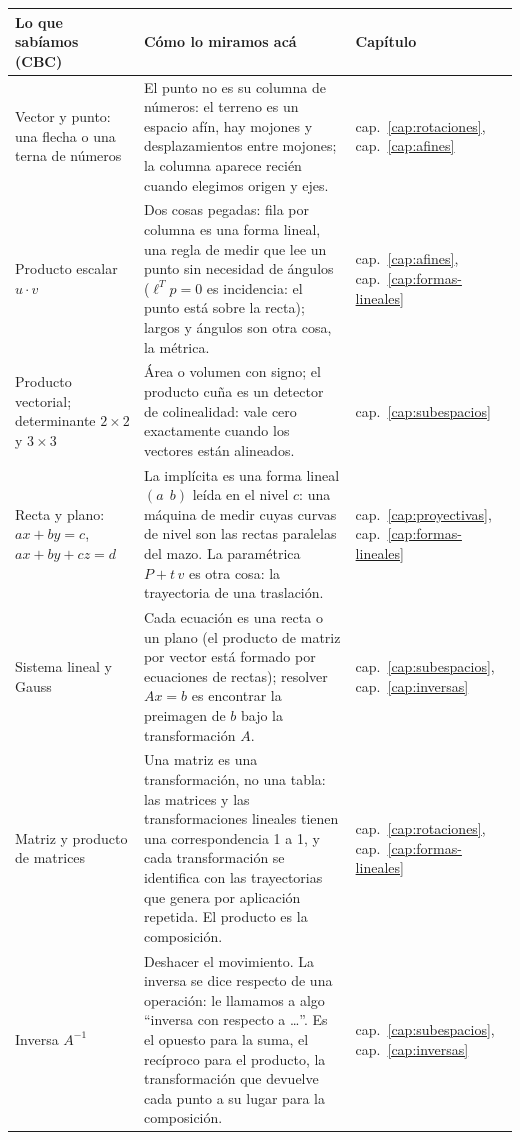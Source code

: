 {\small
\begin{tabularx}{\textwidth}{>{\raggedright\arraybackslash}p{30mm} Y >{\raggedright\arraybackslash}p{17mm}}
\toprule
\textbf{Lo que sabíamos (CBC)} & \textbf{Cómo lo miramos acá} & \textbf{Capítulo}\\
\midrule
Vector y punto: una flecha o una terna de números &
El punto no es su columna de números: el terreno es un espacio afín, hay mojones y
desplazamientos entre mojones; la columna aparece recién cuando elegimos origen y ejes. &
cap.~\ref{cap:rotaciones}, cap.~\ref{cap:afines}\\
Producto escalar \(u\cdot v\) &
Dos cosas pegadas: fila por columna es una forma lineal, una regla de medir que lee un
punto sin necesidad de ángulos (\(\ell^Tp=0\) es incidencia: el punto está sobre la
recta); largos y ángulos son otra cosa, la métrica. &
cap.~\ref{cap:afines}, cap.~\ref{cap:formas-lineales}\\
Producto vectorial; determinante \(2\times2\) y \(3\times3\) &
Área o volumen con signo; el producto cuña es un detector de colinealidad: vale cero exactamente cuando los vectores están alineados. &
cap.~\ref{cap:subespacios}\\
Recta y plano: \(ax+by=c\), \(ax+by+cz=d\) &
La implícita es una forma lineal \((a\ \ b)\) leída en el nivel \(c\): una máquina de medir
cuyas curvas de nivel son las rectas paralelas del mazo. La paramétrica \(P+t\,v\) es otra
cosa: la trayectoria de una traslación. &
cap.~\ref{cap:proyectivas}, cap.~\ref{cap:formas-lineales}\\
Sistema lineal y Gauss &
Cada ecuación es una recta o un plano (el producto de matriz por vector está
formado por ecuaciones de rectas); resolver \(Ax=b\) es encontrar
la preimagen de \(b\) bajo la transformación \(A\). &
cap.~\ref{cap:subespacios}, cap.~\ref{cap:inversas}\\
Matriz y producto de matrices &
Una matriz es una transformación, no una tabla: las matrices y las transformaciones
lineales tienen una correspondencia 1 a 1, y cada transformación se identifica con
las trayectorias que genera por aplicación repetida. El
producto es la composición. &
cap.~\ref{cap:rotaciones}, cap.~\ref{cap:formas-lineales}\\
Inversa \(A^{-1}\) &
Deshacer el movimiento. La inversa se dice respecto de una operación: le llamamos a algo
``inversa con respecto a \ldots''. Es el opuesto para la suma, el
recíproco para el producto, la transformación que devuelve cada punto a su lugar para la
composición. &
cap.~\ref{cap:subespacios}, cap.~\ref{cap:inversas}\\

\end{tabularx}}
